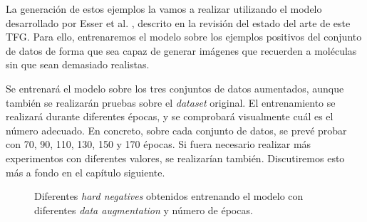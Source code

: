 La generación de estos ejemplos la vamos a realizar utilizando el modelo desarrollado por Esser et al. \cite{esser2021taming}, descrito en la revisión del estado del arte de este TFG. Para ello, entrenaremos el modelo sobre los ejemplos positivos del conjunto de datos de forma que sea capaz de generar imágenes que recuerden a moléculas sin que sean demasiado realistas. 

Se entrenará el modelo sobre los tres conjuntos de datos aumentados, aunque también se realizarán pruebas sobre el \textit{dataset} original. El entrenamiento se realizará durante diferentes épocas, y se comprobará visualmente cuál es el número adecuado. En concreto, sobre cada conjunto de datos, se prevé probar con 70, 90, 110, 130, 150 y 170 épocas. Si fuera necesario realizar más experimentos con diferentes valores, se realizarían también. Discutiremos esto más a fondo en el capítulo siguiente.

\begin{figure}[H]
\centering
    \caption{Diferentes \textit{hard negatives} obtenidos entrenando el modelo con diferentes \textit{data augmentation} y número de épocas.} 
\end{figure}
    
